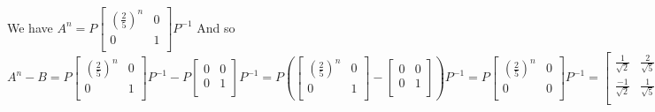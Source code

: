 \documentclass[12pt]{article}
\newenvironment{problems}{\begin{list}{}{\setlength{\labelwidth}{.7in}}}{\end{list}}
\begin{document}
\begin{problems}
 We have $A^n = P\begin{bmatrix}
   (\frac{2}{5})^n  & 0\\
   0  &  1 \\
  \end{bmatrix} P^{-1}$
  And so $A^n-B = P\begin{bmatrix}
   (\frac{2}{5})^n  & 0\\
   0  &  1 \\
  \end{bmatrix} P^{-1} - P\begin{bmatrix}
   0  & 0\\
   0  &  1 \\
  \end{bmatrix} P^{-1} = 
  P\left(  \begin{bmatrix}
   (\frac{2}{5})^n  & 0\\
   0  &  1 \\
  \end{bmatrix} -
  \begin{bmatrix}
   0  & 0\\
   0  &  1 \\
  \end{bmatrix}\right)P^{-1} = 
  P\begin{bmatrix}
   (\frac{2}{5})^n  & 0\\
   0  &  0 \\
  \end{bmatrix} P^{-1} = 
  \begin{bmatrix}
   \frac{1}{\sqrt{2}}  &  \frac{2}{\sqrt{5}} \\
   \frac{-1}{\sqrt{2}}  &  \frac{1}{\sqrt{5}} \\
  \end{bmatrix} 
  \begin{bmatrix}
   (\frac{2}{5})^n  & 0\\
   0  &  0 \\
  \end{bmatrix}
  \begin{bmatrix}
   \frac{\sqrt{2}}{3}  &  \frac{-2\sqrt{2}}{3} \\
   \frac{\sqrt{5}}{3}  &  \frac{\sqrt{5}}{3} \\
  \end{bmatrix}$\\
  

\end{problems}
\end{document}
